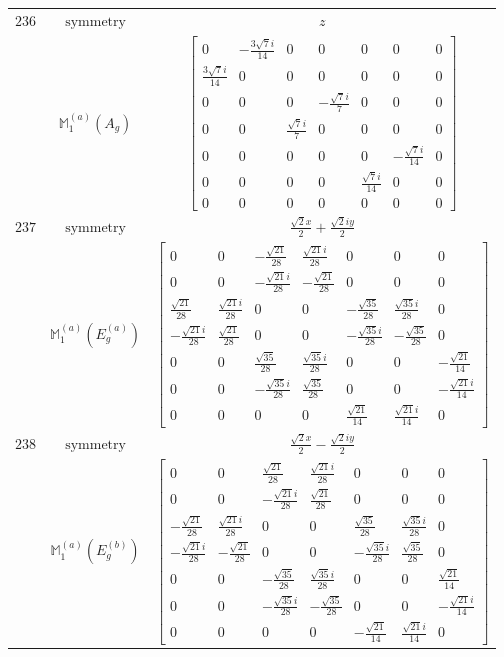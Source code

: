 \documentclass[fleqn,8pt,landscape]{jsarticle}
\begin{document}
\begin{longtable}{ccc}
$ 236 $ & $ \text{symmetry} $ & $ z $ \\
$  $ & $ \mathbb{M}_{1}^{(a)}(A_{g}) $ & $ \begin{bmatrix} 0 & - \frac{3 \sqrt{7} i}{14} & 0 & 0 & 0 & 0 & 0 \\ \frac{3 \sqrt{7} i}{14} & 0 & 0 & 0 & 0 & 0 & 0 \\ 0 & 0 & 0 & - \frac{\sqrt{7} i}{7} & 0 & 0 & 0 \\ 0 & 0 & \frac{\sqrt{7} i}{7} & 0 & 0 & 0 & 0 \\ 0 & 0 & 0 & 0 & 0 & - \frac{\sqrt{7} i}{14} & 0 \\ 0 & 0 & 0 & 0 & \frac{\sqrt{7} i}{14} & 0 & 0 \\ 0 & 0 & 0 & 0 & 0 & 0 & 0 \end{bmatrix} $ \\ \hline
$ 237 $ & $ \text{symmetry} $ & $ \frac{\sqrt{2} x}{2} + \frac{\sqrt{2} i y}{2} $ \\
$  $ & $ \mathbb{M}_{1}^{(a)}(E_{g}^{(a)}) $ & $ \begin{bmatrix} 0 & 0 & - \frac{\sqrt{21}}{28} & \frac{\sqrt{21} i}{28} & 0 & 0 & 0 \\ 0 & 0 & - \frac{\sqrt{21} i}{28} & - \frac{\sqrt{21}}{28} & 0 & 0 & 0 \\ \frac{\sqrt{21}}{28} & \frac{\sqrt{21} i}{28} & 0 & 0 & - \frac{\sqrt{35}}{28} & \frac{\sqrt{35} i}{28} & 0 \\ - \frac{\sqrt{21} i}{28} & \frac{\sqrt{21}}{28} & 0 & 0 & - \frac{\sqrt{35} i}{28} & - \frac{\sqrt{35}}{28} & 0 \\ 0 & 0 & \frac{\sqrt{35}}{28} & \frac{\sqrt{35} i}{28} & 0 & 0 & - \frac{\sqrt{21}}{14} \\ 0 & 0 & - \frac{\sqrt{35} i}{28} & \frac{\sqrt{35}}{28} & 0 & 0 & - \frac{\sqrt{21} i}{14} \\ 0 & 0 & 0 & 0 & \frac{\sqrt{21}}{14} & \frac{\sqrt{21} i}{14} & 0 \end{bmatrix} $ \\ \hline
$ 238 $ & $ \text{symmetry} $ & $ \frac{\sqrt{2} x}{2} - \frac{\sqrt{2} i y}{2} $ \\
$  $ & $ \mathbb{M}_{1}^{(a)}(E_{g}^{(b)}) $ & $ \begin{bmatrix} 0 & 0 & \frac{\sqrt{21}}{28} & \frac{\sqrt{21} i}{28} & 0 & 0 & 0 \\ 0 & 0 & - \frac{\sqrt{21} i}{28} & \frac{\sqrt{21}}{28} & 0 & 0 & 0 \\ - \frac{\sqrt{21}}{28} & \frac{\sqrt{21} i}{28} & 0 & 0 & \frac{\sqrt{35}}{28} & \frac{\sqrt{35} i}{28} & 0 \\ - \frac{\sqrt{21} i}{28} & - \frac{\sqrt{21}}{28} & 0 & 0 & - \frac{\sqrt{35} i}{28} & \frac{\sqrt{35}}{28} & 0 \\ 0 & 0 & - \frac{\sqrt{35}}{28} & \frac{\sqrt{35} i}{28} & 0 & 0 & \frac{\sqrt{21}}{14} \\ 0 & 0 & - \frac{\sqrt{35} i}{28} & - \frac{\sqrt{35}}{28} & 0 & 0 & - \frac{\sqrt{21} i}{14} \\ 0 & 0 & 0 & 0 & - \frac{\sqrt{21}}{14} & \frac{\sqrt{21} i}{14} & 0 \end{bmatrix} $ \\ \hline

\end{longtable}
\end{document}
